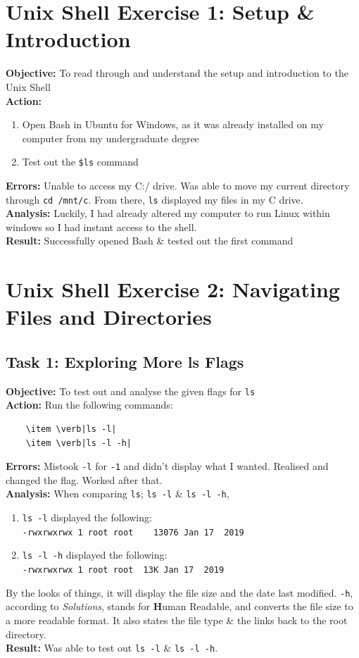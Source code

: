 \documentclass{article}
\begin{document}
\section{Unix Shell Exercise 1: Setup \& Introduction}
\textbf{Objective:} To read through and understand the setup and introduction to the Unix Shell\\
\textbf{Action:}
\begin{enumerate}
    \item Open Bash in Ubuntu for Windows, as it was already installed on my computer from my undergraduate degree
    \item Test out the \verb|$ls| command
\end{enumerate}
\textbf{Errors:} Unable to access my C:/ drive. Was able to move my current directory through \verb|cd /mnt/c|. From there, \texttt{ls} displayed my files in my C drive.\\
\textbf{Analysis:} Luckily, I had already altered my computer to run Linux within windows so I had instant access to the shell.\\
\textbf{Result:} Successfully opened Bash \& tested out the first command
\newpage
\section{Unix Shell Exercise 2: Navigating Files and Directories}
%
\subsection{Task 1: Exploring More ls Flags}
%
\textbf{Objective:} To test out and analyse the given flags for \texttt{ls}\\
\textbf{Action:} Run the following commands:
\begin{verbatim}
    \item \verb|ls -l|
    \item \verb|ls -l -h|
\end{verbatim}
\textbf{Errors:} Mistook \verb|-l| for \verb|-1| and didn't display what I wanted. Realised and changed the flag. Worked after that.\\
\textbf{Analysis:} When comparing \verb|ls|; \verb|ls -l| \& \verb|ls -l -h|, 
\begin{enumerate}
    \item \verb|ls -l| displayed the following: \\
    \verb|-rwxrwxrwx 1 root root    13076 Jan 17  2019|
    \item \verb|ls -l -h| displayed the following: \\
    \verb|-rwxrwxrwx 1 root root  13K Jan 17  2019|
\end{enumerate}
By the looks of things, it will display the file size and the date last modified. \verb|-h|, according to \textit{Solutions}, stands for \textbf{H}uman Readable, and converts the file size to a more readable format. It also states the file type \& the links back to the root directory.\\
\textbf{Result:} Was able to test out \verb|ls -l| \& \verb|ls -l -h|.
%
\end{document}
